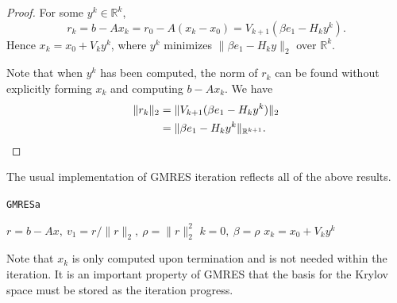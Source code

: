 \begin{proof}
  For some $y^k\in\mathbb{R}^k$,
  $$r_k=b-Ax_k=r_0-A(x_k-x_0)=V_{k+1}(\beta e_1-H_ky^k).$$
  Hence $x_k=x_0+V_ky^k$, where $y^k$ minimizes $\|\beta e_1-H_ky\|_2$
  over $\mathbb{R}^k$.

  Note that when $y^k$ has been computed, the norm of $r_k$ can be
  found without explicitly forming $x_k$ and computing $b-Ax_k$. We
  have
  \begin{equation} 
    \label{eq:3.9}
    \begin{split}
      \|r_k\|_2&=\|V_{k+1}(\beta e_1-H_ky^k)\|_2\\
      &=\|\beta e_1-H_ky^k\|_{\mathbb{R}^{k+1}}. \qedhere
    \end{split}
  \end{equation}
\end{proof}

\begin{algo}
  The usual implementation of GMRES iteration reflects
  all of the above results.

  \IncMargin{1em}
  \LinesNumbered
  \begin{algorithm}[H]

    \caption{\texttt{GMRESa}}
    \BlankLine
    $r=b-Ax,\ v_1=r/\|r\|_2,\ \rho=\|r\|_2^2$\;
    $k=0,\ \beta=\rho$\;
    $x_k=x_0+V_ky^k$\;
  \end{algorithm}
  \DecMargin{1em}
\end{algo}

\begin{rmk}
  \label{sec:impl-basic-ideas}
  Note that $x_k$ is only computed upon termination and is not needed
  within the iteration. It is an important property of GMRES that the
  basis for the Krylov space must be stored as the iteration progress.
\end{rmk}

